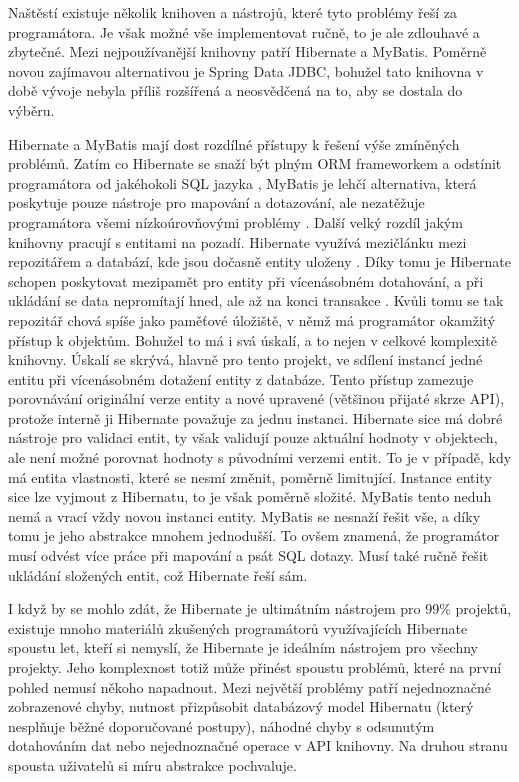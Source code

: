 		Naštěstí existuje několik knihoven a nástrojů, které tyto problémy řeší za programátora.
		Je však možné vše implementovat ručně, to je ale zdlouhavé a zbytečné.
		Mezi nejpoužívanější knihovny patří Hibernate a MyBatis.
		Poměrně novou zajímavou alternativou je Spring Data JDBC, bohužel tato knihovna v době vývoje nebyla příliš
		rozšířená a neosvědčená na to, aby se dostala do výběru.

		Hibernate a MyBatis mají dost rozdílné přístupy k řešení výše zmíněných problémů.
		Zatím co Hibernate se snaží být plným \ac{ORM} frameworkem a odstínit programátora od jakéhokoli
		\ac{SQL} jazyka \cite{hibernate_docs}, MyBatis je lehčí alternativa, která poskytuje pouze nástroje pro mapování a dotazování, ale
		nezatěžuje programátora všemi nízkoúrovňovými problémy \cite{mybatis_getting_started}.
		Další velký rozdíl jakým knihovny pracují s entitami na pozadí.
		Hibernate využívá mezičlánku mezi repozitářem a databází, kde jsou dočasně entity uloženy \cite{hibernate_docs}.
		Díky tomu je Hibernate schopen poskytovat mezipamět pro entity při vícenásobném dotahování, a při ukládání
		se data nepromítají hned, ale až na konci transakce \cite{hibernate_docs}.
		Kvůli tomu se tak repozitář chová spíše jako paměťové úložiště, v němž má programátor okamžitý přístup k objektům.
		Bohužel to má i svá úskalí, a to nejen v celkové komplexitě knihovny.
		Úskalí se skrývá, hlavně pro tento projekt, ve sdílení instancí jedné entitu při vícenásobném
		dotažení entity z databáze.
		Tento přístup zamezuje porovnávání originální verze entity a nové upravené (většinou přijaté skrze \ac{API}),
		protože interně ji Hibernate považuje za jednu instanci.
		Hibernate sice má dobré nástroje pro validaci entit, ty však validují pouze aktuální hodnoty v objektech, ale
		není možné porovnat hodnoty s původními verzemi entit.
		To je v případě, kdy má entita vlastnosti, které se nesmí změnit, poměrně limitující.
		Instance entity sice lze vyjmout z Hibernatu, to je však poměrně složité.
		MyBatis tento neduh nemá a vrací vždy novou instanci entity.
		MyBatis se nesnaží řešit vše, a díky tomu je jeho abstrakce mnohem jednodušší.
		To ovšem znamená, že programátor musí odvést více práce při mapování a psát \ac{SQL} dotazy.
		Musí také ručně řešit ukládání složených entit, což Hibernate řeší sám.

		I když by se mohlo zdát, že Hibernate je ultimátním nástrojem pro 99\% projektů, existuje mnoho materiálů
		zkušených programátorů využívajících Hibernate spoustu let, kteří si nemyslí, že Hibernate je ideálním nástrojem
		pro všechny projekty.
		Jeho komplexnost totiž může přinést spoustu problémů, které na první pohled nemusí někoho napadnout.
		Mezi největší problémy patří nejednoznačné zobrazenové chyby, nutnost přizpůsobit databázový model Hibernatu
		(který nesplňuje běžné doporučované postupy), náhodné chyby s odsunutým dotahováním dat nebo nejednoznačné operace
		v \ac{API} knihovny.
		Na druhou stranu spousta uživatelů si míru abstrakce pochvaluje. \cite{bad_hibernate}

